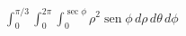 \item $\int_0^{\pi/3} \int_0^{2\pi} \int_0^{\sec \phi} \rho^2 \operatorname{sen} \phi \, d\rho \, d\theta \, d\phi$
